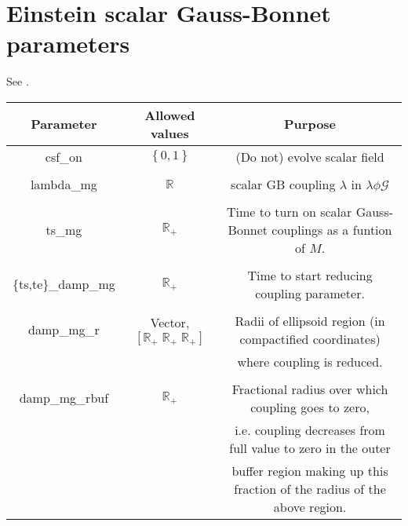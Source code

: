 \documentclass{article}
\begin{document}
\section*{Einstein scalar Gauss-Bonnet parameters}
See \cite{East:2020hgw}.
\begin{table}[h]
   \centering 
   \begin{tabular}{ccc}
      Parameter  & Allowed values & Purpose \\
      \midrule\midrule
      csf\_on 
      &
      $\left\{0,1\right\}$
      &
      (Do not) evolve scalar field
      \\ \\
      lambda\_mg 
      &
      $\mathbb{R}$
      &
      scalar GB coupling $\lambda$ in $\lambda\phi\mathcal{G}$
      \\ \\
      ts\_mg 
      &
      $\mathbb{R}_+$
      &
      Time to turn on scalar Gauss-Bonnet couplings as a funtion of $M$.
      \\ \\
      \{ts,te\}\_damp\_mg 
      &
      $\mathbb{R}_+$
      &
      Time to start reducing coupling parameter.
      \\ \\
      damp\_mg\_r 
      &
      Vector, $\left[
         \mathbb{R}_+ \; \mathbb{R}_+ \; \mathbb{R}_+
      \right]$
      &
      Radii of ellipsoid region (in compactified coordinates) 
      \\
      & & 
      where coupling is reduced.
      \\ \\
      damp\_mg\_rbuf 
      &
      $\mathbb{R}_+$
      &
      Fractional radius over which coupling goes to zero,
      \\
      & & 
      i.e. coupling decreases from full value to zero in the outer 
      \\
      & & 
      buffer region making up this fraction of the radius of the above region.
   \end{tabular}
\end{table}


\end{document}
